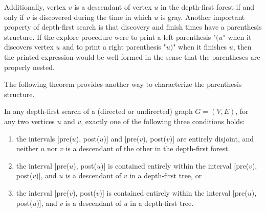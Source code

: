 Additionally, vertex $v$ is a descendant of vertex $u$ in the depth-first forest if and only if $v$ is discovered during the time in which $u$ is gray. Another important property of depth-first search is that discovery and finish times have a parenthesis structure. If the explore procedure were to print a left parenthesis "$(u$" when it discovers vertex $u$ and to print a right parenthesis "$u)$" when it finishes $u$, then the printed expression would be well-formed in the sense that the parentheses are properly nested.

The following theorem provides another way to characterize the parenthesis structure.

\begin{theorem}
In any depth-first search of a (directed or undirected) graph $G = (V, E)$, for any two vertices $u$ and $v$, exactly one of the following three conditions holds:

\begin{enumerate}
  \item the intervals [pre($u$), post($u$)] and [pre($v$), post($v$)] are entirely disjoint, and neither $u$ nor $v$ is a descendant of the other in the depth-first forest.
  \item the interval [pre($u$), post($u$)] is contained entirely within the interval [pre($v$), post($v$)], and $u$ is a descendant of $v$ in a depth-first tree, or
  \item the interval [pre($v$), post($v$)] is contained entirely within the interval [pre($u$), post($u$)], and $v$ is a descendant of $u$ in a depth-first tree.
  \end{enumerate}
\end{theorem}
